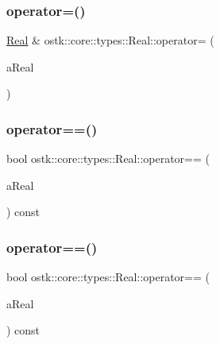 \mbox{\label{classostk_1_1core_1_1types_1_1_real_a9911035535b29c33869cac51cf7684e7}} 
\subsubsection{\texorpdfstring{operator=()}{operator=()}}
{\footnotesize\ttfamily \hyperlink{classostk_1_1core_1_1types_1_1_real}{Real} \& ostk\+::core\+::types\+::\+Real\+::operator= (\begin{DoxyParamCaption}\item[{\hyperlink{classostk_1_1core_1_1types_1_1_real_aa26f796c30b514c98d573f82e3b02296}{Real\+::\+Value\+Type}}]{a\+Real }\end{DoxyParamCaption})}

\mbox{\label{classostk_1_1core_1_1types_1_1_real_abe182a8cfeab28ab9c5895d0ed20f200}} 
\subsubsection{\texorpdfstring{operator==()}{operator==()}\hspace{0.1cm}{\footnotesize\ttfamily [1/2]}}
{\footnotesize\ttfamily bool ostk\+::core\+::types\+::\+Real\+::operator== (\begin{DoxyParamCaption}\item[{const \hyperlink{classostk_1_1core_1_1types_1_1_real}{Real} \&}]{a\+Real }\end{DoxyParamCaption}) const}

\mbox{\label{classostk_1_1core_1_1types_1_1_real_a6d8d4730a2c81916a2d5155327de418f}} 
\subsubsection{\texorpdfstring{operator==()}{operator==()}\hspace{0.1cm}{\footnotesize\ttfamily [2/2]}}
{\footnotesize\ttfamily bool ostk\+::core\+::types\+::\+Real\+::operator== (\begin{DoxyParamCaption}\item[{const \hyperlink{classostk_1_1core_1_1types_1_1_real_aa26f796c30b514c98d573f82e3b02296}{Real\+::\+Value\+Type} \&}]{a\+Real }\end{DoxyParamCaption}) const}

